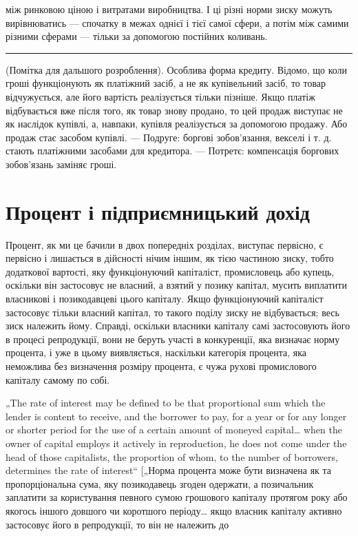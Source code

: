 \parcont{}  %
між ринковою ціною і витратами виробництва. І ці різні норми
зиску можуть вирівнюватись — спочатку в межах однієї і тієї
самої сфери, а потім між самими різними сферами — тільки за
допомогою постійних коливань.

\pfbreak

(Помітка для дальшого розроблення). Особлива форма кредиту.
Відомо, що коли гроші функціонують як платіжний засіб,
а не як купівельний засіб, то товар відчужується, але його
вартість реалізується тільки пізніше. Якщо платіж відбувається
вже після того, як товар знову продано, то цей продаж виступає
не як наслідок купівлі, а, навпаки, купівля реалізується за
допомогою продажу. Або продаж стає засобом купівлі. — Подруге:
боргові зобов’язання, векселі і т. д. стають платіжними
засобами для кредитора. — Потретє: компенсація боргових зобов’язань
заміняє гроші.

\section{Процент і підприємницький дохід}

Процент, як ми це бачили в двох попередніх розділах, виступає
первісно, є первісно і лишається в дійсності нічим
іншим, як тією частиною зиску, тобто додаткової вартості,
яку функціонуючий капіталіст, промисловець або купець,
оскільки він застосовує не власний, а взятий у позику капітал,
мусить виплатити власникові і позикодавцеві цього капіталу.
Якщо функціонуючий капіталіст застосовує тільки власний капітал,
то такого поділу зиску не відбувається; весь зиск належить
йому. Справді, оскільки власники капіталу самі застосовують
його в процесі репродукції, вони не беруть участі в
конкуренції, яка визначає норму процента, і уже в цьому виявляється,
наскільки категорія процента, яка неможлива без визначення
розміру процента, є чужа рухові промислового капіталу
самому по собі.

„The rate of interest may be defined to be that proportional sum
which the lender is content to receive, and the borrower to pay, for
a year or for any longer or shorter period for the use of a certain
amount of moneyed capital\dots{} when the owner of capital employs
it actively in reproduction, he does not come under the head of
those capitalists, the proportion of whom, to the number of borrowers,
determines the rate of interest“ [„Норма процента може
бути визначена як та пропорціональна сума, яку позикодавець
згоден одержати, а позичальник заплатити за користування певного
сумою грошового капіталу протягом року або якогось іншого
довшого чи коротшого періоду\dots{} якщо власник капіталу
активно застосовує його в репродукції, то він не належить до
\parbreak{}  %
